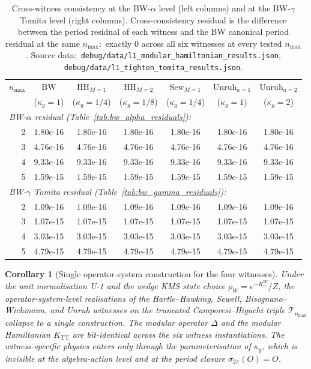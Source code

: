 \documentclass[11pt,a4paper]{article}
\theoremstyle{plain}
\newtheorem{corollary}[theorem]{Corollary}
\theoremstyle{definition}
\newcommand{\nmax}{n_{\max}}
\newcommand{\Tcal}{\mathcal{T}}
\newcommand{\TT}{\mathrm{TT}}
\newcommand{\BW}{\mathrm{BW}}
\newcommand{\HH}{\mathrm{HH}}
\newcommand{\Sew}{\mathrm{Sew}}
\newcommand{\Unruh}{\mathrm{Unruh}}
\begin{document}
\begin{table}[ht]
\centering
\caption{Cross-witness consistency at the BW-$\alpha$ level
(left columns) and at the BW-$\gamma$ Tomita level (right columns).
Cross-consistency residual is the difference between the period
residual of each witness and the BW canonical period residual at the
same $\nmax$:\ exactly $0$ across all six witnesses
at every tested $\nmax$. Source data:\
\texttt{debug/data/l1\_modular\_hamiltonian\_results.json},
\texttt{debug/data/l1\_tighten\_tomita\_results.json}.}
\label{tab:cross_witness}
\renewcommand{\arraystretch}{1.1}
\setlength{\tabcolsep}{4pt}
\begin{tabular}{rcccccc}
\toprule
$\nmax$ & $\BW$ & $\HH_{M=1}$ & $\HH_{M=2}$ & $\Sew_{M=1}$ & $\Unruh_{a=1}$ & $\Unruh_{a=2}$ \\
& ($\kappa_g\!=\!1$) & ($\kappa_g\!=\!1/4$) & ($\kappa_g\!=\!1/8$) & ($\kappa_g\!=\!1/4$) & ($\kappa_g\!=\!1$) & ($\kappa_g\!=\!2$) \\
\midrule
\multicolumn{7}{l}{\emph{BW-$\alpha$ residual (Table~\ref{tab:bw_alpha_residuals}):}} \\
2 & 1.80e-16 & 1.80e-16 & 1.80e-16 & 1.80e-16 & 1.80e-16 & 1.80e-16 \\
3 & 4.76e-16 & 4.76e-16 & 4.76e-16 & 4.76e-16 & 4.76e-16 & 4.76e-16 \\
4 & 9.33e-16 & 9.33e-16 & 9.33e-16 & 9.33e-16 & 9.33e-16 & 9.33e-16 \\
5 & 1.59e-15 & 1.59e-15 & 1.59e-15 & 1.59e-15 & 1.59e-15 & 1.59e-15 \\
\midrule
\multicolumn{7}{l}{\emph{BW-$\gamma$ Tomita residual (Table~\ref{tab:bw_gamma_residuals}):}} \\
2 & 1.09e-16 & 1.09e-16 & 1.09e-16 & 1.09e-16 & 1.09e-16 & 1.09e-16 \\
3 & 1.07e-15 & 1.07e-15 & 1.07e-15 & 1.07e-15 & 1.07e-15 & 1.07e-15 \\
4 & 3.03e-15 & 3.03e-15 & 3.03e-15 & 3.03e-15 & 3.03e-15 & 3.03e-15 \\
5 & 4.79e-15 & 4.79e-15 & 4.79e-15 & 4.79e-15 & 4.79e-15 & 4.79e-15 \\
\bottomrule
\end{tabular}
\end{table}

\begin{corollary}[Single operator-system construction for the four
witnesses]\label{cor:single_construction}
Under the unit normalisation U-1 and the wedge KMS state choice
$\rho_W = e^{-K_\alpha^W}/Z$, the operator-system-level realisations of
the Hartle--Hawking, Sewell, Bisognano--Wichmann, and Unruh witnesses
on the truncated Camporesi--Higuchi triple $\Tcal_{\nmax}$ collapse to
a single construction. The modular operator $\Delta$ and the modular
Hamiltonian $K_{\TT}$ are bit-identical across the six witness
instantiations. The witness-specific physics enters only through the
parameterisation of $\kappa_g$, which is invisible at the
algebra-action level and at the period closure $\sigma_{2\pi}(O) = O$.
\end{corollary}
\end{document}
